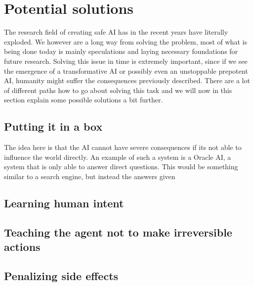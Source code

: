 \documentclass[12pt,A4]{report}
\theoremstyle{definition}
\begin{document}
\section{Potential solutions}
The research field of creating safe AI has in the recent years have literally exploded. We however are a long way from solving the problem, most of what is being done today is mainly speculations and laying necessary foundations for future research. Solving this issue in time is extremely important, since if we see the emergence of a transformative AI or possibly even an unstoppable prepotent AI, humanity might suffer the consequences previously described. There are a lot of different paths how to go about solving this task and we will now in this section explain some possible solutions a bit further.

\subsection{Putting it in a box}
The idea here is that the AI cannot have severe consequences if its not able to influence the world directly. An example of such a system is a Oracle AI, a system that is only able to answer direct questions. This would be something similar to a search engine, but instead the answers given

\subsection{Learning human intent} 

\subsection{Teaching the agent not to make irreversible actions}






\subsection{Penalizing side effects}
\end{document}
